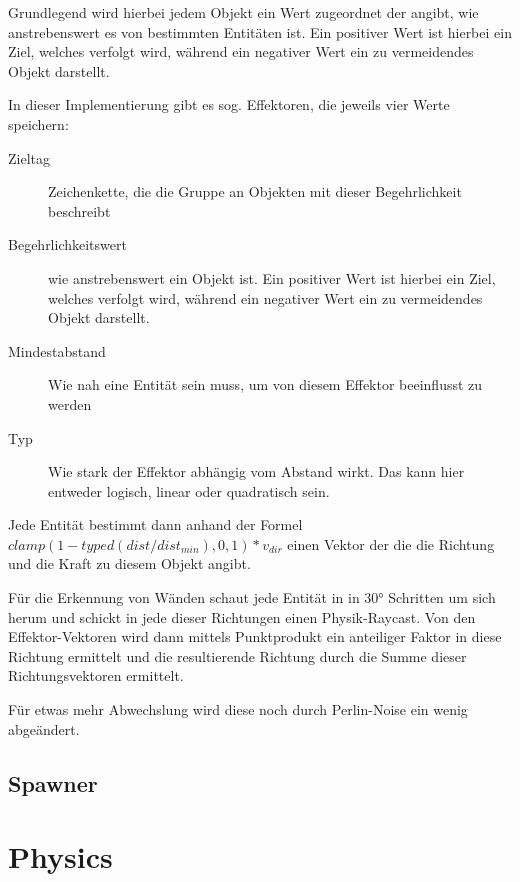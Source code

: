 \documentclass[a4paper,10pt,ngerman,fontsize=12pt]{scrreprt}
\begin{document}
Grundlegend wird hierbei jedem Objekt ein Wert zugeordnet der angibt, wie anstrebenswert es von bestimmten Entitäten ist. Ein positiver Wert ist hierbei ein Ziel, welches verfolgt wird, während ein negativer Wert ein zu vermeidendes Objekt darstellt.

In dieser Implementierung gibt es sog. Effektoren, die jeweils vier Werte speichern:

\begin{description}
\item[Zieltag] Zeichenkette, die die Gruppe an Objekten mit dieser Begehrlichkeit beschreibt
\item[Begehrlichkeitswert] wie anstrebenswert ein Objekt ist. Ein positiver Wert ist hierbei ein Ziel, welches verfolgt wird, während ein negativer Wert ein zu vermeidendes Objekt darstellt.
\item[Mindestabstand] Wie nah eine Entität sein muss, um von diesem Effektor beeinflusst zu werden
\item[Typ] Wie stark der Effektor abhängig vom Abstand wirkt. Das kann hier entweder logisch, linear oder quadratisch sein. 
\end{description}

Jede Entität bestimmt dann anhand der Formel $ clamp(1 - typed(dist / dist_{min}), 0, 1) * v_{dir} $ einen Vektor der die die Richtung und die Kraft zu diesem Objekt angibt.

Für die Erkennung von Wänden schaut jede Entität in in 30° Schritten um sich herum und schickt in jede dieser Richtungen einen Physik-Raycast. Von den Effektor-Vektoren wird dann  mittels Punktprodukt ein anteiliger Faktor in diese Richtung ermittelt und die resultierende Richtung durch die Summe dieser Richtungsvektoren ermittelt.

Für etwas mehr Abwechslung wird diese noch durch Perlin-Noise ein wenig abgeändert.



\subsection{Spawner}
\label{subsect:spawner}

\lipsum[3]


\section{Physics}

\lipsum[3]
\end{document}
